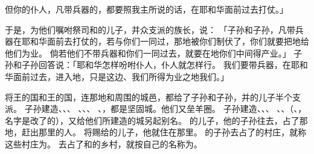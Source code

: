 {但你的仆人，凡带兵器的，都要照我主所说的话，在耶和华面前过去打仗。」
\par }{\PP {}于是，{}为他们嘱咐祭司{}和{}的儿子{}，并{}众支派的族长，说：
「{}子孙和{}子孙，凡带兵器在耶和华面前去打仗的，若与你们一同过{}，那地被你们制伏了，你们就要把{}地给他们为业。
倘若他们不带兵器和你们一同过去，就要在{}地你们中间得产业。」
子孙和{}子孙回答说：「耶和华怎样吩咐仆人，仆人就怎样行。
我们要带兵器，在耶和华面前过去，进入{}地，只是{}这边、我们所得为业之地{}我们。」
\par }{\PP {}将{}王{}的国和{}王{}的国，连那地和周围的城邑，都给了{}子孙和{}子孙，并{}的儿子{}半个支派。
子孙建造{}、{}、{}、
、{}、{}、
、{}，都是坚固城。他们又垒羊圈。
子孙建造{}、{}、{}、
、{}、{}（{}、{}，名字是改了的），又给他们所建造的城另起别名。
的儿子{}，他的子孙往{}去，占了那地，赶出那里的{}人。
将{}赐给{}的儿子{}，他{}就住在那里。
的子孙{}去占了{}的村庄，就称这些村庄为{}。
去占了{}和{}的乡村，就按自己的名称{}为{}。

}
